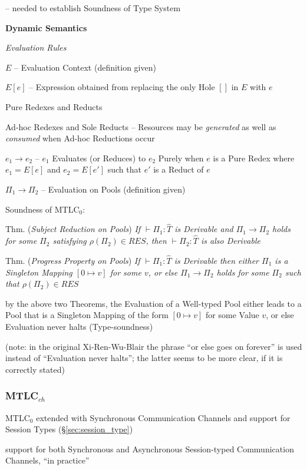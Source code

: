-- needed to establish Soundness of Type System


\textbf{Dynamic Semantics}

\emph{Evaluation Rules}

$E$ -- Evaluation Context (definition given)

$E[e]$ -- Expression obtained from replacing the only Hole $[]$ in $E$
with $e$

Pure Redexes and Reducts

Ad-hoc Redexes and Sole Reducts -- Resources may be \emph{generated}
as well as \emph{consumed} when Ad-hoc Reductions occur

$e_1 \rightarrow e_2$ -- $e_1$ Evaluates (or Reduces) to $e_2$ Purely
when $e$ is a Pure Redex where $e_1 = E[e]$ and $e_2 = E[e']$ such
that $e'$ is a Reduct of $e$

$\Pi_1 \rightarrow \Pi_2$ -- Evaluation on Pools (definition given)

Soundness of MTLC$_0$:

Thm. (\emph{Subject Reduction on Pools}) \emph{If $\vdash \Pi_1 :
  \hat{T}$ is Derivable and $\Pi_1 \rightarrow \Pi_2$ holds for some
  $\Pi_2$ satisfying $\rho(\Pi_2) \in RES$, then $\vdash \Pi_2 :
  \hat{T}$ is also Derivable}

Thm. (\emph{Progress Property on Pools}) \emph{If $\vdash\Pi_1 :
  \hat{T}$ is Derivable then either $\Pi_1$ is a Singleton Mapping $[0
    \mapsto v]$ for some $v$, or else $\Pi_1 \rightarrow \Pi_2$ holds
  for some $\Pi_2$ such that $\rho(\Pi_2) \in RES$}

by the above two Theorems, the Evaluation of a Well-typed Pool either
leads to a Pool that is a Singleton Mapping of the form $[0 \mapsto
  v]$ for some Value $v$, or else Evaluation never halts
(Type-soundness)

(note: in the original Xi-Ren-Wu-Blair the phrase ``or else goes on
forever'' is used instead of ``Evaluation never halts''; the latter
seems to be more clear, if it is correctly stated)



\subsubsection{MTLC$_{ch}$}\label{sec:mtlc_ch}

MTLC$_0$ extended with Synchronous Communication Channels and support
for Session Types (\S\ref{sec:session_type})

support for both Synchronous and Asynchronous Session-typed
Communication Channels, ``in practice'' %

